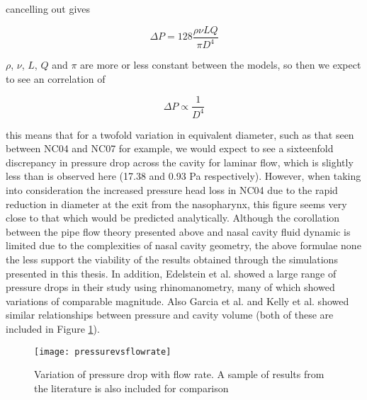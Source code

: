 cancelling out gives

\begin{equation}
  \Delta P = 128 \frac{\rho \nu L Q}{\pi D^4}
\end{equation}

$\rho$, $\nu$, $L$, $Q$ and $\pi$ are more or less constant between the models, so then we expect to see an correlation of

\begin{equation} \label{corollation}
  \Delta P \propto \frac{1}{D^4}
\end{equation}

this means that for a twofold variation in equivalent diameter, such as that seen between NC04 and NC07 for example, we would expect to see a sixteenfold discrepancy in pressure drop across the cavity for laminar flow, which is slightly less than is observed here (17.38 and 0.93 Pa respectively). However, when taking into consideration the increased pressure head loss in NC04 due to the rapid reduction in diameter at the exit from the nasopharynx, this figure seems very close to that which would be predicted analytically. Although the corollation between the pipe flow theory presented above and nasal cavity fluid dynamic is limited due to the complexities of nasal cavity geometry, the above formulae none the less support the viability of the results obtained through the simulations presented in this thesis.
In addition, Edelstein et al. \cite{Edelstein1996} showed a large range of pressure drops in their study using rhinomanometry, many of which showed variations of comparable magnitude. Also Garcia et al. \cite{Garcia2007} and Kelly et al. \cite{Kelly2004} showed similar relationships between pressure and cavity volume (both of these are included in Figure \ref{tab:pvv}).

  \begin{figure} 
    \texttt{[image: pressurevsflowrate]}
      \caption{Variation of pressure drop with flow rate. A sample of results from the literature is also included for comparison}
  \label{tab:pvv}
\end{figure}

%

